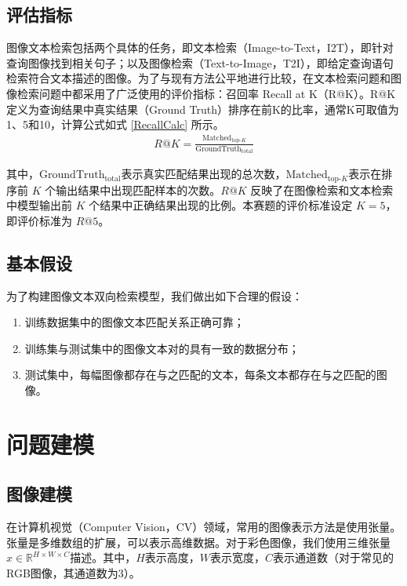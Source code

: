 \documentclass[a4paper]{zreport}
\begin{document}
\subsection{评估指标}

图像文本检索包括两个具体的任务，即文本检索（Image-to-Text，I2T），即针对查询图像找到相关句子；以及图像检索（Text-to-Image，T2I），即给定查询语句检索符合文本描述的图像。为了与现有方法公平地进行比较，在文本检索问题和图像检索问题中都采用了广泛使用的评价指标：召回率 Recall at K（R@K）。R@K定义为查询结果中真实结果（Ground Truth）排序在前K的比率，通常K可取值为1、5和10，计算公式如式 \eqref{RecallCalc} 所示。
\begin{gather}
R@K=\frac{\mathrm{Matched}_{\text{top-}K}}{\mathrm{GroundTruth}_{\text{total}}}\label{RecallCalc}
\end{gather}

其中，$\mathrm{GroundTruth}_{\text{total}}$表示真实匹配结果出现的总次数，$\mathrm{Matched}_{\text{top-}K}$表示在排序前 $K$ 个输出结果中出现匹配样本的次数。$R@K$ 反映了在图像检索和文本检索中模型输出前 $K$ 个结果中正确结果出现的比例。本赛题的评价标准设定 $K=5$，即评价标准为 $R@5$。

\subsection{基本假设}

为了构建图像文本双向检索模型，我们做出如下合理的假设：

\begin{enumerate}
\item 训练数据集中的图像文本匹配关系正确可靠；
\item 训练集与测试集中的图像文本对的具有一致的数据分布；
\item 测试集中，每幅图像都存在与之匹配的文本，每条文本都存在与之匹配的图像。
\end{enumerate}

\newpage

\section{问题建模}

\subsection{图像建模}

在计算机视觉（Computer Vision，CV）领域，常用的图像表示方法是使用张量。张量是多维数组的扩展，可以表示高维数据。对于彩色图像，我们使用三维张量$x \in \mathbb{R}^{H \times W \times C}$描述。其中，$H$表示高度，$W$表示宽度，$C$表示通道数（对于常见的RGB图像，其通道数为3）。
\end{document}
